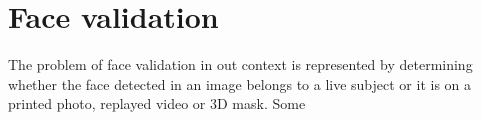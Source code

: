 \section{Face validation}
The problem of face validation in out context is represented by determining whether the face detected in an image belongs to a live subject or it is on a printed photo, replayed video or 3D mask. Some